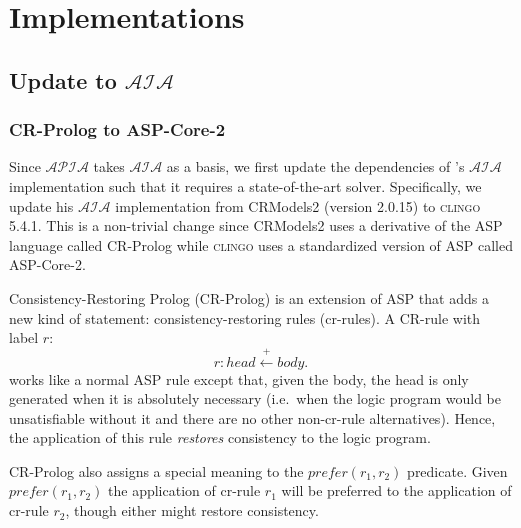 \chapter{Implementations}

%

\section{Update to $\mathcal{AIA}$}

\subsection{CR-Prolog to ASP-Core-2}

Since $\mathcal{APIA}$ takes $\mathcal{AIA}$ as a basis, we first update the dependencies of \citet{blount_architecture_2013,blount_towards_2014}'s $\mathcal{AIA}$ implementation such that it requires a state-of-the-art solver\footnotemark.
Specifically, we update his $\mathcal{AIA}$ implementation from CRModels2 (version 2.0.15) to \textsc{clingo} 5.4.1.
This is a non-trivial change since CRModels2 uses a derivative of the ASP language called CR-Prolog while \textsc{clingo} uses a standardized version of ASP called ASP-Core-2.


Consistency-Restoring Prolog (CR-Prolog) is an extension of ASP that adds a new kind of statement: consistency-restoring rules (cr-rules).
A CR-rule with label $r$:
\begin{equation}
    r: head \stackrel{+}\leftarrow body.
\end{equation}
works like a normal ASP rule except that, given the body, the head is only generated when it is absolutely necessary (i.e.~when the logic program would be unsatisfiable without it and there are no other non-cr-rule alternatives).
Hence, the application of this rule \textit{restores} consistency to the logic program.

CR-Prolog also assigns a special meaning to the $prefer(r_1, r_2)$ predicate.
Given $prefer(r_1, r_2)$ the application of cr-rule $r_1$ will be preferred to the application of cr-rule $r_2$, though either might restore consistency.

